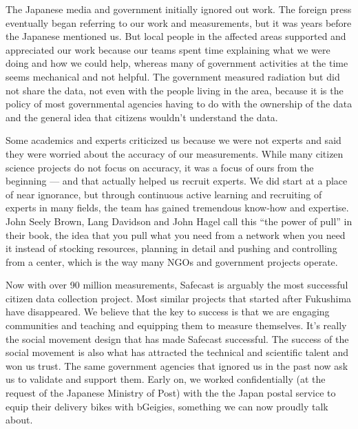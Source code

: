 The Japanese media and government initially ignored out work. The foreign press eventually began referring to our work and measurements, but it was years before the Japanese mentioned us. But local people in the affected areas supported and appreciated our work because our teams spent time explaining what we were doing and how we could help, whereas many of government activities at the time seems mechanical and not helpful. The government measured radiation but did not share the data, not even with the people living in the area, because it is the policy of most governmental agencies having to do with the ownership of the data and the general idea that citizens wouldn't understand the data.

Some academics and experts criticized us because we were not experts and said they were worried about the accuracy of our measurements. While many citizen science projects do not focus on accuracy, it was a focus of ours from the beginning --- and that actually helped us recruit experts. We did start at a place of near ignorance, but through continuous active learning and recruiting of experts in many fields, the team has gained tremendous know-how and expertise. John Seely Brown, Lang Davidson and John Hagel call this ``the power of pull'' \cite{hagel2010power} in their book, the idea that you pull what you need from a network when you need it instead of stocking resources, planning in detail and pushing and controlling from a center, which is the way many \ac{NGO}s and government projects operate.

Now with over 90 million measurements, Safecast is arguably the most successful citizen data collection project. Most similar projects that started after Fukushima have disappeared. We believe that the key to success is that we are engaging communities and teaching and equipping them to measure themselves. It's really the social movement design that has made Safecast successful. The success of the social movement is also what has attracted the technical and scientific talent and won us trust. The same government agencies that ignored us in the past now ask us to validate and support them. Early on, we worked confidentially (at the request of the Japanese Ministry of Post) with the the Japan postal service to equip their delivery bikes with bGeigies, something we can now proudly talk about.

